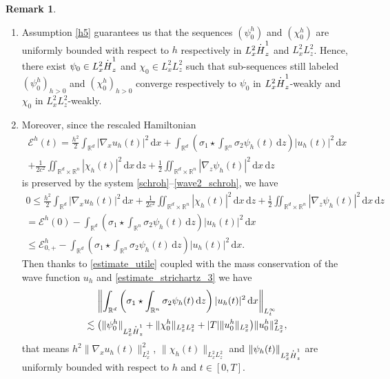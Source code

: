 \documentclass[11pt]{article}
\newcommand{\skpt}{\smallskip}
\newenvironment{enumeratei}
{\bgroup\def\theenumi{\roman{enumi}}\def\theenumii{\arabic{enumii}}\begin{enumerate}}
{\end{enumerate}\egroup}
\DeclareRobustCommand{\accentset}[2]{\overset{#1}{#2}}
\theoremstyle{definition}
\newtheorem{rmk}[lemma]{Remark}
\newcommand*{\overbigdot}[1]{%
\accentset{\mbox{\large\bfseries .}}{#1}}
\newcommand{\R}{\mathbb{R}}
\newcommand{\ud}{\, {\mathrm{d}}}
\begin{document}
\skpt
\begin{rmk}\label{rmk_h5}
\begin{enumeratei}
\item
Assumption \eqref{h5} guarantees us that the sequences $(\psi_{0}^{h})$ and $(\chi_{0}^{h})$ are uniformly bounded with respect to $h$ respectively in $L_{x}^{2}\overbigdot{H}_{z}^{1}$ and $L_{x}^{2}L_{z}^{2}$. Hence, there exist $\psi_{0}\in L_{x}^{2}\overbigdot{H}_{z}^{1}$ and $\chi_{0}\in L_{x}^{2}L_{z}^{2}$ such that sub-sequences still labeled $(\psi_{0}^{h})_{h>0}$ and $(\chi_{0}^{h})_{h>0}$ converge respectively to $\psi_{0}$ in $L_{x}^{2}\overbigdot{H}_{z}^{1}$-weakly and $\chi_{0}$ in $L_{x}^{2}L_{z}^{2}$-weakly.

\item
Moreover, since the rescaled Hamiltonian
\begin{multline*}
\mathscr{E}^{h}(t)=\frac{h^{2}}{2}\int_{\R^{d}}|\nabla_{x}u_{h}(t)|^{2}\ud x+\int_{\R^{d}}\left(\sigma_{1}\star\int_{\R^{n}}\sigma_{2}\psi_{h}(t)\ud z\right)|u_{h}(t)|^{2}\ud x\\
+\frac{1}{2c^{2}}\iint_{\R^{d}\times\R^{n}}|\chi_{h}(t)|^{2}\ud x\ud z+\frac{1}{2}\iint_{\R^{d}\times\R^{n}}|\nabla_{z}\psi_{h}(t)|^{2}\ud x\ud z
\end{multline*}
is preserved by the system \eqref{schroh}--\eqref{wave2_schroh}, we have
\bgroup
{}
\begin{multline*}
0\leq\frac{h^{2}}{2}\int_{\R^{d}}|\nabla_{x}u_{h}(t)|^{2}\ud x+\frac{1}{2c^{2}}\iint_{\R^{d}\times\R^{n}}|\chi_{h}(t)|^{2}\ud x\ud z+\frac{1}{2}\iint_{\R^{d}\times\R^{n}}|\nabla_{z}\psi_{h}(t)|^{2}\ud x\ud z\\
= \mathscr{E}^{h}(0)-\int_{\R^{d}}\left(\sigma_{1}\star\int_{\R^{n}}\sigma_{2}\psi_{h}(t)\ud z\right)|u_{h}(t)|^{2}\ud x\\
\leq \mathscr{E}_{0,+}^{h}-\int_{\R^{d}}\left(\sigma_{1}\star\int_{\R^{n}}\sigma_{2}\psi_{h}(t)\ud z\right)|u_{h}(t)|^{2}\ud x.
\end{multline*}
\egroup
Then thanks to \eqref{estimate_utile} coupled with the mass conservation of the wave function $u_{h}$ and \eqref{estimate_strichartz_3} we have
\begin{multline*}
\left\|\int_{\R^{d}}\left(\sigma_{1}\star\int_{\R^{n}}\sigma_{2}\psi_{h}(t)\ud z\right)|u_{h}(t)|^{2}\ud x\right\|_{L_{t}^{\infty}}\\
\lesssim\bigl(\|\psi_{0}^{h}\|_{L_{x}^{2}\overbigdot{H}_{z}^{1}}+\|\chi_{0}^{h}\|_{L_{x}^{2}L_{z}^{2}}+|T|\|u_{0}^{h}\|_{L_{x}^{2}}\bigr)\|u_{0}^{h}\|_{L_{x}^{2}}^{2},
\end{multline*}
that means $h^{2}\|\nabla_{x}u_{h}(t)\|_{L_{x}^{2}}^{2}$, $\|\chi_{h}(t)\|_{L_{x}^{2}L_{z}^{2}}$ and $\|\psi_{h}(t)\|_{L_{x}^{2}\overbigdot{H}_{z}^{1}}$ are uniformly bounded with respect to $h$ and $t\in[0,T]$.
\end{enumeratei}
\end{rmk}
\end{document}

